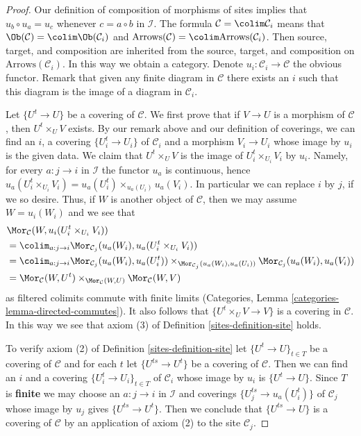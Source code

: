 \begin{proof}

Our definition of composition of morphisms of sites implies that
$u_b \circ u_a = u_c$ whenever $c = a \circ b$ in $\mathcal{I}$.
The formula $\mathcal{C} = \colim \mathcal{C}_i$ means that
$\Ob(\mathcal{C}) = \colim \Ob(\mathcal{C}_i)$ and
$\text{Arrows}(\mathcal{C}) = \colim \text{Arrows}(\mathcal{C}_i)$.
Then source, target, and composition are inherited from the
source, target, and composition on $\text{Arrows}(\mathcal{C}_i)$.
In this way we obtain a category.
Denote $u_i : \mathcal{C}_i \to \mathcal{C}$ the obvious functor.
Remark that given any finite diagram in $\mathcal{C}$
there exists an $i$ such that this diagram is
the image of a diagram in $\mathcal{C}_i$.

\medskip\noindent
Let $\{U^t \to U\}$ be a covering of $\mathcal{C}$. We first prove that if
$V \to U$ is a morphism of $\mathcal{C}$, then $U^t \times_U V$ exists.
By our remark above and our definition of coverings, we can find an
$i$, a covering $\{U_i^t \to U_i\}$ of $\mathcal{C}_i$ and a morphism
$V_i \to U_i$ whose image by $u_i$ is the given data. We claim that
$U^t \times_U V$ is the image of $U^t_i \times_{U_i} V_i$ by $u_i$.
Namely, for every $a : j \to i$ in $\mathcal{I}$ the functor $u_a$
is continuous, hence
$u_a(U^t_i \times_{U_i} V_i) = u_a(U^t_i) \times_{u_a(U_i)} u_a(V_i)$.
In particular we can replace $i$ by $j$, if we so desire.
Thus, if $W$ is another object of $\mathcal{C}$, then we may
assume $W = u_i(W_i)$ and we see that
\begin{align*}
& \Mor_\mathcal{C}(W, u_i(U^t_i \times_{U_i} V_i)) \\
& =
\colim_{a : j \to i}
\Mor_{\mathcal{C}_j}(u_a(W_i), u_a(U^t_i \times_{U_i} V_i)) \\
& =
\colim_{a : j \to i}
\Mor_{\mathcal{C}_j}(u_a(W_i), u_a(U^t_i))
\times_{\Mor_{\mathcal{C}_j}(u_a(W_i), u_a(U_i))}
\Mor_{\mathcal{C}_j}(u_a(W_i), u_a(V_i)) \\
& =
\Mor_\mathcal{C}(W, U^t)
\times_{\Mor_\mathcal{C}(W, U)}
\Mor_\mathcal{C}(W, V)
\end{align*}
as filtered colimits commute with finite limits
(Categories, Lemma \ref{categories-lemma-directed-commutes}).
It also follows that
$\{U^t \times_U V \to V\}$ is a covering in $\mathcal{C}$.
In this way we see that axiom (3) of Definition \ref{sites-definition-site} holds.

\medskip\noindent
To verify axiom (2) of Definition \ref{sites-definition-site}
let $\{U^t \to U\}_{t \in T}$ be a covering of $\mathcal{C}$
and for each $t$ let $\{U^{ts} \to U^t\}$ be a covering of
$\mathcal{C}$. Then we can find an $i$ and a covering
$\{U^t_i \to U_i\}_{t \in T}$ of $\mathcal{C}_i$ whose image by $u_i$ is
$\{U^t \to U\}$. Since $T$ is {\bf finite} we may choose an $a : j \to i$
in $\mathcal{I}$ and coverings $\{U^{ts}_j \to u_a(U^t_i)\}$ of
$\mathcal{C}_j$ whose image by $u_j$ gives $\{U^{ts} \to U^t\}$.
Then we conclude that $\{U^{ts} \to U\}$ is a covering of $\mathcal{C}$
by an application of axiom (2) to the site $\mathcal{C}_j$.


\end{proof}
